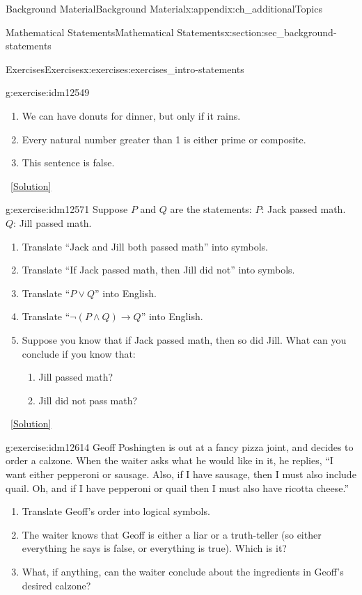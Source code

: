 \documentclass[oneside,10pt,]{book}
\numberwithin{equation}{chapter}
\def\imp{\rightarrow}
\begin{document}
\begin{appendixptx}{Background Material}{}{Background Material}{}{}{x:appendix:ch_additionalTopics}
\begin{sectionptx}{Mathematical Statements}{}{Mathematical Statements}{}{}{x:section:sec_background-statements}
\begin{exercises-subsection}{Exercises}{}{Exercises}{}{}{x:exercises:exercises_intro-statements}
\begin{divisionexercise}{1}{}{}{g:exercise:idm12549}
\begin{enumerate}[label=(\alph*)]
\item{}We can have donuts for dinner, but only if it rains.%
\item{}Every natural number greater than 1 is either prime or composite.%
\item{}This sentence is false.%
\end{enumerate}
%
\qquad~\hfill{\tiny\hyperlink{g:solution:idm12559-main}{[Solution]}}\end{divisionexercise}%
\begin{divisionexercise}{2}{}{}{g:exercise:idm12571}%
Suppose \(P\) and \(Q\) are the statements: \(P\): Jack passed math. \(Q\): Jill passed math.%
%
\begin{enumerate}[label=(\alph*)]
\item{}Translate ``Jack and Jill both passed math'' into symbols.%
\item{}Translate ``If Jack passed math, then Jill did not'' into symbols.%
\item{}Translate ``\(P \vee Q\)'' into English.%
\item{}Translate ``\(\neg(P \wedge Q) \imp Q\)'' into English.%
\item{}Suppose you know that if Jack passed math, then so did Jill.  What can you conclude if you know that:%
\begin{enumerate}[label=\roman*.]
\item{}Jill passed math?%
\item{}Jill did not pass math?%
\end{enumerate}
%
\end{enumerate}
\qquad~\hfill{\tiny\hyperlink{g:solution:idm12598-main}{[Solution]}}\end{divisionexercise}%
\begin{divisionexercise}{3}{}{}{g:exercise:idm12614}%
Geoff Poshingten is out at a fancy pizza joint, and decides to order a calzone. When the waiter asks what he would like in it, he replies, ``I want either pepperoni or sausage. Also, if I have sausage, then I must also include quail. Oh, and if I have pepperoni or quail then I must also have ricotta cheese.''%
%
\begin{enumerate}[label=(\alph*)]
\item{}Translate Geoff's order into logical symbols.%
\item{}The waiter knows that Geoff is either a liar or a truth-teller (so either everything he says is false, or everything is true).  Which is it?%
\item{}What, if anything, can the waiter conclude about the ingredients in Geoff's desired calzone?%

\end{enumerate}
\end{divisionexercise}
\end{exercises-subsection}
\end{sectionptx}
\end{appendixptx}
\end{document}
